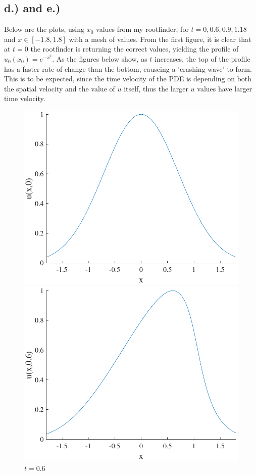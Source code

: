 \documentclass{article}
\begin{document}
\subsection*{d.) and e.)}
Below are the plots, using $x_0$ values from my rootfinder, for $t = 0, 0.6, 0.9, 1.18$ and $x \in [-1.8, 1.8]$ with a mesh of values. From the first figure, it is clear that at $t=0$ the rootfinder is returning the correct values, yielding the profile of $u_0(x_0) = e^{-x^2}$. As the figures below show, as $t$ increases, the top of the profile has a faster rate of change than the bottom, causeing a 'crashing wave' to form. This is to be expected, since the time velocity of the PDE is depending on both the spatial velocity and the value of $u$ itself, thus the larger $u$ values have larger time velocity.
\begin{figure}[H]
  \centering
  \begin{minipage}[b]{0.49\textwidth}
    \includegraphics[width=\textwidth]{hw_13_plot2.pdf}
    \caption{$t = 0$}

  \end{minipage}
  \hfill
  \begin{minipage}[b]{0.49\textwidth}
    \includegraphics[width=\textwidth]{hw_13_plot3.pdf}
    \caption{$t = 0.6$}


\end{minipage}
\end{figure}
\end{document}
